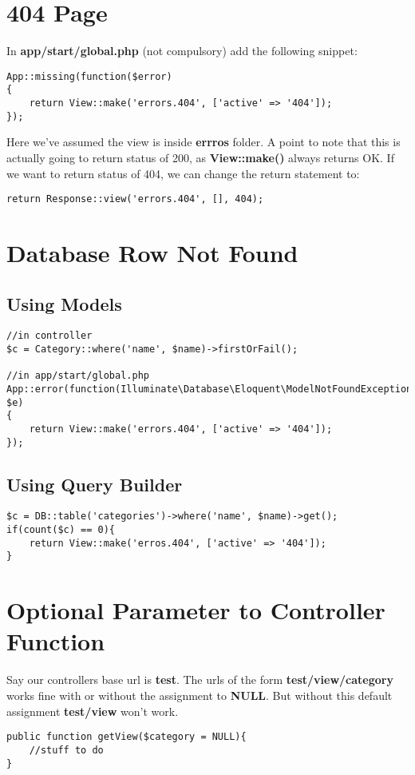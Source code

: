 \documentclass[a4paper, 10pt]{article}
\begin{document}
\section{404 Page}
In \textbf{app/start/global.php} (not compulsory) add the following snippet:
\begin{verbatim}
App::missing(function($error)
{
    return View::make('errors.404', ['active' => '404']);
});
\end{verbatim}
Here we've assumed the view is inside \textbf{errros} folder.
A point to note that this is actually going to return status of 200,
as \textbf{View::make()} always returns OK.
If we want to return status of 404, we can change the return statement to:
\begin{verbatim}
return Response::view('errors.404', [], 404);
\end{verbatim}

\section{Database Row Not Found}
\subsection{Using Models}
\begin{verbatim}
//in controller
$c = Category::where('name', $name)->firstOrFail();

//in app/start/global.php
App::error(function(Illuminate\Database\Eloquent\ModelNotFoundException $e)
{
    return View::make('errors.404', ['active' => '404']);
});
\end{verbatim}
\subsection{Using Query Builder}
\begin{verbatim}
$c = DB::table('categories')->where('name', $name)->get();
if(count($c) == 0){
    return View::make('erros.404', ['active' => '404']);
}
\end{verbatim}

\section{Optional Parameter to Controller Function}
Say our controllers base url is \textbf{test}. The urls of
the form \textbf{test/view/category} works fine with or without
the assignment to \textbf{NULL}. But without this default assignment
\textbf{test/view} won't work.
\begin{verbatim}
public function getView($category = NULL){
    //stuff to do
}
\end{verbatim}
\end{document}
